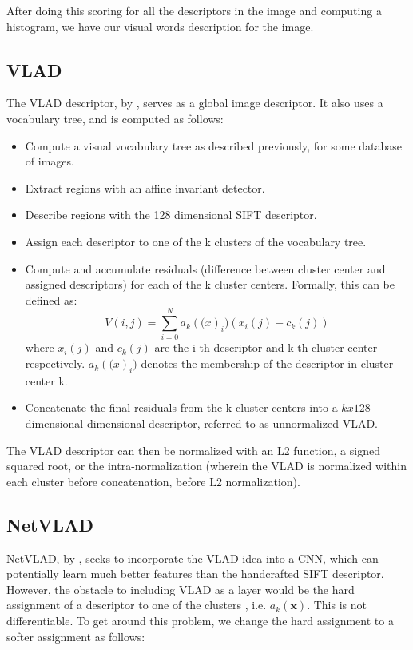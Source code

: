 After doing this scoring for all the descriptors in the image and computing a histogram, we have our visual words description for the image. 

\subsection{VLAD}
The VLAD descriptor, by \cite{Arandlejovic2013}, serves as a global image descriptor. It also uses a vocabulary tree, and is computed as follows:

\begin{itemize}
	\item Compute a visual vocabulary tree as described previously, for some database of images. \\
	\item Extract regions with an affine invariant detector.\\
	\item Describe regions with the 128 dimensional SIFT descriptor. \\
	\item Assign each descriptor to one of the k clusters of the vocabulary tree.\\
	\item Compute and accumulate residuals (difference between cluster center and assigned descriptors) for each of the k cluster centers. Formally, this can
	be defined as:
	\[V(i, j) = \sum_{i=0}^{N}a_k(\mathcal(x)_i)(x_i(j) - c_k(j))\]
	where $x_i(j)$ and $c_k(j)$ are the i-th descriptor and k-th cluster center respectively. $a_k(\mathcal(x)_i)$ denotes the membership of the descriptor in 
	cluster center k.\\
	\item Concatenate the final residuals from the k cluster centers into a $k x 128$ dimensional dimensional descriptor, referred to as unnormalized VLAD.
\end{itemize}

The VLAD descriptor can then be normalized with an L2 function, a signed squared root, or the intra-normalization (wherein the VLAD is normalized within each 
cluster before concatenation, before L2 normalization).

\subsection{NetVLAD}
NetVLAD, by \cite{Arandlejovic2015}, seeks to incorporate the VLAD idea into a CNN, which can potentially learn much better features than the handcrafted SIFT descriptor. However, the 
obstacle to including VLAD as a layer would be the hard assignment of a descriptor to one of the clusters , i.e. $a_k(\mathbf{x})$. This is not differentiable. 
To get around this problem, we change the hard assignment to a softer assignment as follows:

